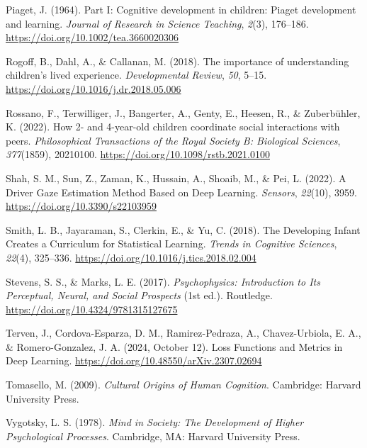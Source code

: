 \documentclass[
  man,floatsintext]{apa6}
\newlength{\cslhangindent}
\newenvironment{CSLReferences}[2] %
 {\begin{list}{}{%
  \setlength{\itemindent}{0pt}
  \setlength{\leftmargin}{0pt}
  \setlength{\parsep}{0pt}
  \ifodd #1
   \setlength{\leftmargin}{\cslhangindent}
   \setlength{\itemindent}{-1\cslhangindent}
  \fi
  \setlength{\itemsep}{#2\baselineskip}}}
 {\end{list}}
\begin{document}
\begin{CSLReferences}{1}{0}
Piaget, J. (1964). Part {I}: {Cognitive} development in children: {Piaget} development and learning. \emph{Journal of Research in Science Teaching}, \emph{2}(3), 176--186. \url{https://doi.org/10.1002/tea.3660020306}

Rogoff, B., Dahl, A., \& Callanan, M. (2018). The importance of understanding children's lived experience. \emph{Developmental Review}, \emph{50}, 5--15. \url{https://doi.org/10.1016/j.dr.2018.05.006}

Rossano, F., Terwilliger, J., Bangerter, A., Genty, E., Heesen, R., \& Zuberbühler, K. (2022). How 2- and 4-year-old children coordinate social interactions with peers. \emph{Philosophical Transactions of the Royal Society B: Biological Sciences}, \emph{377}(1859), 20210100. \url{https://doi.org/10.1098/rstb.2021.0100}

Shah, S. M., Sun, Z., Zaman, K., Hussain, A., Shoaib, M., \& Pei, L. (2022). A {Driver Gaze Estimation Method Based} on {Deep Learning}. \emph{Sensors}, \emph{22}(10), 3959. \url{https://doi.org/10.3390/s22103959}

Smith, L. B., Jayaraman, S., Clerkin, E., \& Yu, C. (2018). The {Developing Infant Creates} a {Curriculum} for {Statistical Learning}. \emph{Trends in Cognitive Sciences}, \emph{22}(4), 325--336. \url{https://doi.org/10.1016/j.tics.2018.02.004}

Stevens, S. S., \& Marks, L. E. (2017). \emph{Psychophysics: {Introduction} to {Its Perceptual}, {Neural}, and {Social Prospects}} (1st ed.). Routledge. \url{https://doi.org/10.4324/9781315127675}

Terven, J., Cordova-Esparza, D. M., Ramirez-Pedraza, A., Chavez-Urbiola, E. A., \& Romero-Gonzalez, J. A. (2024, October 12). Loss {Functions} and {Metrics} in {Deep Learning}. \url{https://doi.org/10.48550/arXiv.2307.02694}

Tomasello, M. (2009). \emph{Cultural {Origins} of {Human Cognition}}. Cambridge: Harvard University Press.

Vygotsky, L. S. (1978). \emph{Mind in {Society}: {The Development} of {Higher Psychological Processes}}. Cambridge, MA: Harvard University Press.


\end{CSLReferences}
\end{document}

